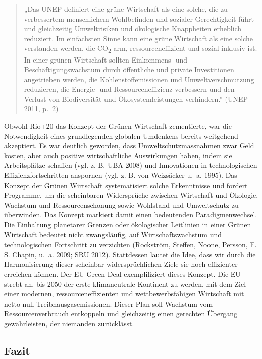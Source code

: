 \documentclass[
  nswissgerman,
  a4paper,
  openany]{book}
\begin{document}
\begin{quote}
„Das UNEP definiert eine grüne Wirtschaft als eine solche, die zu
verbessertem menschlichem Wohlbefinden und sozialer Gerechtigkeit führt
und gleichzeitig Umweltrisiken und ökologische Knappheiten erheblich
reduziert. Im einfachsten Sinne kann eine grüne Wirtschaft als eine
solche verstanden werden, die CO\textsubscript{2}-arm,
ressourceneffizient und sozial inklusiv ist. In einer grünen Wirtschaft
sollten Einkommens- und Beschäftigungswachstum durch öffentliche und
private Investitionen angetrieben werden, die Kohlenstoffemissionen und
Umweltverschmutzung reduzieren, die Energie- und Ressourceneffizienz
verbessern und den Verlust von Biodiversität und Ökosystemleistungen
verhindern.'' (UNEP 2011, p.~2)
\end{quote}

Obwohl Rio+20 das Konzept der Grünen Wirtschaft zementierte, war die
Notwendigkeit eines grundlegenden globalen Umdenkens bereits weitgehend
akzeptiert. Es war deutlich geworden, dass Umweltschutzmassnahmen zwar
Geld kosten, aber auch positive wirtschaftliche Auswirkungen haben,
indem sie Arbeitsplätze schaffen (vgl. z. B. UBA 2008) und Innovationen
in technologischen Effizienzfortschritten anspornen (vgl. z. B. {von
Weizsäcker u.~a.} 1995). Das Konzept der Grünen Wirtschaft
systematisiert solche Erkenntnisse und fordert Programme, um die
scheinbaren Widersprüche zwischen Wirtschaft und Ökologie, Wachstum und
Ressourcenschonung sowie Wohlstand und Umweltschutz zu überwinden. Das
Konzept markiert damit einen bedeutenden Paradigmenwechsel. Die
Einhaltung planetarer Grenzen oder ökologischer Leitlinien in einer
Grünen Wirtschaft bedeutet nicht zwangsläufig, auf Wirtschaftswachstum
und technologischen Fortschritt zu verzichten (Rockström, Steffen,
Noone, Persson, F. S. Chapin, u.~a. 2009; SRU 2012). Stattdessen lautet
die Idee, dass wir durch die Harmonisierung dieser scheinbar
widersprüchlichen Ziele sie noch effizienter erreichen können. Der EU
Green Deal exemplifiziert dieses Konzept. Die EU strebt an, bis 2050 der
erste klimaneutrale Kontinent zu werden, mit dem Ziel einer modernen,
ressourceneffizienten und wettbewerbsfähigen Wirtschaft mit netto null
Treibhausgasemissionen. Dieser Plan soll Wachstum vom
Ressourcenverbrauch entkoppeln und gleichzeitig einen gerechten Übergang
gewährleisten, der niemanden zurücklässt.

\subsection{Fazit}\label{fazit-3}
\end{document}
